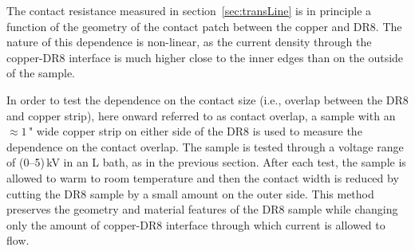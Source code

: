 \documentclass[a4paper,12pt]{article}
\newcommand{\DR}{DR8}
\begin{document}
The contact resistance measured in section~\ref{sec:transLine} is in principle a function of the geometry of the contact patch between the copper and {\DR}.  The nature of this dependence is non-linear, as the current density through the copper-{\DR} interface is much higher close to the inner edges than on the outside of the sample.

In order to test the dependence on the contact size (i.e., overlap between the {\DR} and copper strip), here onward referred to as contact overlap, a  sample with an $\approx 1$\," wide copper strip on either side of the {\DR} is used to measure the dependence on the contact overlap.  The sample is tested through a voltage range of (0--5)\,kV in an L bath, as in the previous section.  After each test, the sample is allowed to warm to room temperature and then the contact width is reduced by cutting the {\DR} sample by a small amount on the outer side.  This method preserves the geometry and material features of the {\DR} sample while changing only the amount of copper-{\DR} interface through which current is allowed to flow.
\end{document}
